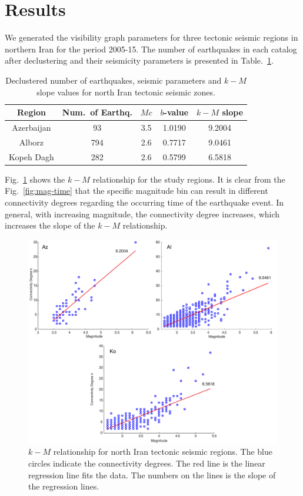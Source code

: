 
\section{Results}

We generated the visibility graph parameters for three tectonic seismic regions in northern Iran for the period 2005-15. The number of earthquakes in each catalog after declustering and their seismicity parameters is presented in Table.~\ref{tab:b_k_m_param}. 

\begin{table}[h]
	\centering
	\caption{Declustered number of earthquakes, seismic parameters and $k-M$ slope values for north Iran tectonic seismic zones.}
	\begin{tabular}{ccccc}
		Region      & Num.~of Earthq. &  $Mc$ & $b$-value & $k-M$ slope \\ 
		\hline
		Azerbaijan  & 93              & 3.5   & 1.0190    & 9.2004      \\
		Alborz      & 794             & 2.6   & 0.7717    & 9.0461      \\
		Kopeh Dagh  & 282             & 2.6   & 0.5799    & 6.5818      \\
		\hline
	\end{tabular}
	\label{tab:b_k_m_param}
\end{table}

Fig.~\ref{fig:k_m_plot_m}  shows the  $k-M$  relationship for the study regions. It is clear from the Fig.~\ref{fig:mag-time} that the specific magnitude bin can result in different connectivity degrees regarding the occurring time of the earthquake event. In general, with increasing magnitude, the connectivity degree increases, which increases the slope of the  $k-M$  relationship. 

\begin{figure}[t]
	\centering
	\includegraphics[scale=0.35]{figures/pdf/Figure07.pdf} 
	\caption{ $k-M$ relationship for north Iran tectonic seismic regions. The blue circles indicate the connectivity degrees. The red line is the linear regression line fits the data. The numbers on the lines is the slope of the regression lines.}
	\label{fig:k_m_plot_m}
\end{figure}

